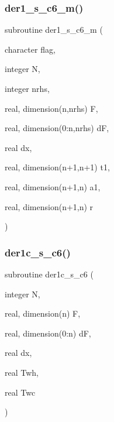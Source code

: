\mbox{\label{ders__n_8f_aea38cda3265a27d6c7509cc8a1d0b864}} 
\subsubsection{\texorpdfstring{der1\+\_\+s\+\_\+c6\+\_\+m()}{der1\_s\_c6\_m()}}
{\footnotesize\ttfamily subroutine der1\+\_\+s\+\_\+c6\+\_\+m (\begin{DoxyParamCaption}\item[{character}]{flag,  }\item[{integer}]{N,  }\item[{integer}]{nrhs,  }\item[{real, dimension(n,nrhs)}]{F,  }\item[{real, dimension(0\+:n,nrhs)}]{dF,  }\item[{real}]{dx,  }\item[{real, dimension(n+1,n+1)}]{t1,  }\item[{real, dimension(n+1,n)}]{a1,  }\item[{real, dimension(n+1,n)}]{r }\end{DoxyParamCaption})}

\mbox{\label{ders__n_8f_ad28fd0993dc50a6f7a02d4a758e77255}} 
\subsubsection{\texorpdfstring{der1c\+\_\+s\+\_\+c6()}{der1c\_s\_c6()}}
{\footnotesize\ttfamily subroutine der1c\+\_\+s\+\_\+c6 (\begin{DoxyParamCaption}\item[{integer}]{N,  }\item[{real, dimension(n)}]{F,  }\item[{real, dimension(0\+:n)}]{dF,  }\item[{real}]{dx,  }\item[{real}]{Twh,  }\item[{real}]{Twc }\end{DoxyParamCaption})}

\mbox{\label{ders__n_8f_a491558d4ef2c9c158ffd119794a6e139}} 
